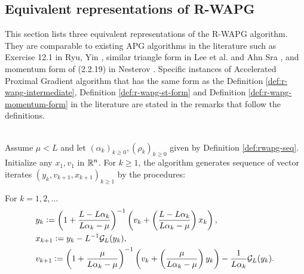\documentclass[12pt]{article}
\begin{document}
    \subsection{Equivalent representations of R-WAPG}
        This section lists three equivalent representations of the R-WAPG algorithm.
        They are comparable to existing APG algorithms in the literature such as Exercise 12.1 in Ryu, Yin \cite{ryu_large-scale_2022}, similar triangle form in Lee et al. \cite{lee_geometric_2021} and Ahn Sra \cite{ahn_understanding_2022}, and momentum form of (2.2.19) in Nesterov \cite{nesterov_lectures_2018}.
        Specific instances of Accelerated Proximal Gradient algorithm that has the same form as the Definition \ref{def:r-wapg-intermediate}, Definition \ref{def:r-wapg-st-form} and Definition \ref{def:r-wapg-momentum-form} in the literature are stated in the remarks that follow the definitions.
        \begin{definition}\label{def:r-wapg-intermediate}\;\\
            Assume $\mu < L$ and let $(\alpha_k)_{k \ge 0}, (\rho_k)_{k \ge 0}$ given by Definition \ref{def:rwapg-seq}.
            Initialize any $x_1, v_1$ in $\mathbb R^n$.
            For $k \ge 1$, the algorithm generates sequence of vector iterates $(y_{k}, v_{k + 1}, x_{k + 1})_{k \ge 1}$ by the procedures:
            \begin{tcolorbox}
                For $k = 1, 2, \ldots$
                \begin{align*}
                    & y_{k} \vcentcolon=
                    \left(
                        1 + \frac{L - L\alpha_{k}}{L\alpha_{k} - \mu}
                    \right)^{-1}
                    \left(
                        v_{k} +
                        \left(\frac{L - L\alpha_{k}}{L\alpha_{k} - \mu} \right) x_{k}
                    \right),
                    \\
                    & x_{k + 1} \vcentcolon=
                    y_k - L^{-1} \mathcal G_L (y_k),
                    \\
                    & v_{k + 1} \vcentcolon=
                    \left(
                        1 + \frac{\mu}{L \alpha_k - \mu}
                    \right)^{-1}
                    \left(
                        v_k +
                        \left(\frac{\mu}{L \alpha_k - \mu}\right) y_k
                    \right) - \frac{1}{L\alpha_{k}}\mathcal G_L (y_k).
                \end{align*}
            \end{tcolorbox}
        \end{definition}
\end{document}
